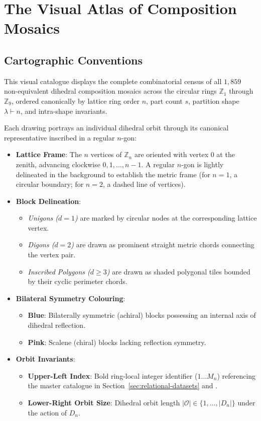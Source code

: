 \chapter{The Visual Atlas of Composition Mosaics}
\label{chap:visual-atlas}

\section*{Cartographic Conventions}

This visual catalogue displays the complete combinatorial census of all $1{,}859$ non-equivalent dihedral composition mosaics across the circular rings $\mathbb{Z}_1$ through $\mathbb{Z}_9$, ordered canonically by lattice ring order $n$, part count $s$, partition shape $\lambda \vdash n$, and intra-shape invariants.

Each drawing portrays an individual dihedral orbit through its canonical representative inscribed in a regular $n$-gon:
\begin{itemize}
    \item \textbf{Lattice Frame}: The $n$ vertices of $\mathbb{Z}_n$ are oriented with vertex $0$ at the zenith, advancing clockwise $0, 1, \dots, n-1$. A regular $n$-gon is lightly delineated in the background to establish the metric frame (for $n=1$, a circular boundary; for $n=2$, a dashed line of vertices).
    \item \textbf{Block Delineation}:
    \begin{itemize}
        \item \emph{Unigons ($d=1$)} are marked by circular nodes at the corresponding lattice vertex.
        \item \emph{Digons ($d=2$)} are drawn as prominent straight metric chords connecting the vertex pair.
        \item \emph{Inscribed Polygons ($d \ge 3$)} are drawn as shaded polygonal tiles bounded by their cyclic perimeter chords.
    \end{itemize}
    \item \textbf{Bilateral Symmetry Colouring}:
    \begin{itemize}
        \item \textbf{Blue}: Bilaterally symmetric (achiral) blocks possessing an internal axis of dihedral reflection.
        \item \textbf{Pink}: Scalene (chiral) blocks lacking reflection symmetry.
    \end{itemize}
    \item \textbf{Orbit Invariants}:
    \begin{itemize}
        \item \textbf{Upper-Left Index}: Bold ring-local integer identifier ($1 \dots M_n$) referencing the master catalogue in Section~\ref{sec:relational-datasets} and .
        \item \textbf{Lower-Right Orbit Size}: Dihedral orbit length $|\mathcal{O}| \in \{1, \dots, |D_n|\}$ under the action of $D_n$.
    \end{itemize}
\end{itemize}

